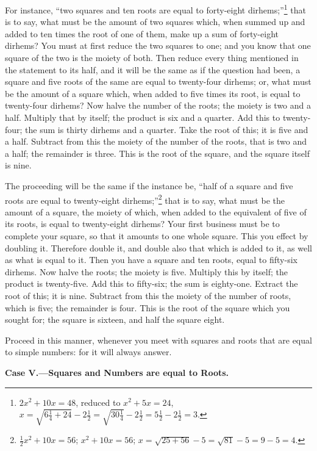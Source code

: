 For instance, ``two squares and ten roots are equal to forty-eight dirhems;''\footnote{$2x^2 + 10x = 48$, reduced to $x^2 + 5x = 24$,\\$x = \sqrt{6\frac{1}{4} + 24} - 2\frac{1}{2} = \sqrt{30\frac{1}{4}} - 2\frac{1}{2} = 5\frac{1}{2} - 2\frac{1}{2} = 3$.} that is to say, what must be the amount of two squares which, when summed up and added to ten times the root of one of them, make up a sum of forty-eight dirhems? You must at first reduce the two squares to one; and you know that one square of the two is the moiety of both. Then reduce every thing mentioned in the statement to its half, and it will be the same as if the question had been, a square and five roots of the same are equal to twenty-four dirhems; or, what must be the amount of a square which, when added to five times its root, is equal to twenty-four dirhems? Now halve the number of the roots; the moiety is two and a half. Multiply that by itself; the product is six and a quarter. Add this to twenty-four; the sum is thirty dirhems and a quarter. Take the root of this; it is five and a half. Subtract from this the moiety of the number of the roots, that is two and a half; the remainder is three. This is the root of the square, and the square itself is nine.

The proceeding will be the same if the instance be, ``half of a square and five roots are equal to twenty-eight dirhems;''\footnote{$\frac{1}{2}x^2 + 10x = 56$; $x^2 + 10x = 56$; $x = \sqrt{25 + 56} - 5 = \sqrt{81} - 5 = 9 - 5 = 4$.} that is to say, what must be the amount of a square, the moiety of which, when added to the equivalent of five of its roots, is equal to twenty-eight dirhems? Your first business must be to complete your square, so that it amounts to one whole square. This you effect by doubling it. Therefore double it, and double also that which is added to it, as well as what is equal to it. Then you have a square and ten roots, equal to fifty-six dirhems. Now halve the roots; the moiety is five. Multiply this by itself; the product is twenty-five. Add this to fifty-six; the sum is eighty-one. Extract the root of this; it is nine. Subtract from this the moiety of the number of roots, which is five; the remainder is four. This is the root of the square which you sought for; the square is sixteen, and half the square eight.

Proceed in this manner, whenever you meet with squares and roots that are equal to simple numbers: for it will always answer.

\vspace{0.3cm}
\noindent\textbf{Case V.---Squares and Numbers are equal to Roots.}

